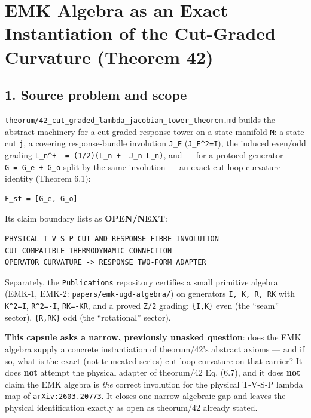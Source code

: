 \hypertarget{emk-algebra-as-an-exact-instantiation-of-the-cut-graded-curvature-theorem-42}{%
\chapter{EMK Algebra as an Exact Instantiation of the Cut-Graded Curvature (Theorem 42)}\label{emk-algebra-as-an-exact-instantiation-of-the-cut-graded-curvature-theorem-42}}

\hypertarget{source-problem-and-scope}{%
\section{1. Source problem and scope}\label{source-problem-and-scope}}

\texttt{theorum/42\_cut\_graded\_lambda\_jacobian\_tower\_theorem.md} builds the abstract
machinery for a cut-graded response tower on a state manifold \texttt{M}: a state
cut \texttt{j}, a covering response-bundle involution \texttt{J\_E} (\texttt{J\_E\^{}2=I}), the induced
even/odd grading \texttt{L\_n\^{}+-\ =\ (1/2)(L\_n\ +-\ J\_n\ L\_n)}, and --- for a protocol
generator \texttt{G\ =\ G\_e\ +\ G\_o} split by the same involution --- an exact cut-loop
curvature identity (Theorem 6.1):

\begin{verbatim}
F_st = [G_e, G_o]
\end{verbatim}

Its claim boundary lists as \textbf{OPEN/NEXT}:

\begin{verbatim}
PHYSICAL T-V-S-P CUT AND RESPONSE-FIBRE INVOLUTION
CUT-COMPATIBLE THERMODYNAMIC CONNECTION
OPERATOR CURVATURE -> RESPONSE TWO-FORM ADAPTER
\end{verbatim}

Separately, the \texttt{Publications} repository certifies a small primitive
algebra (EMK-1, EMK-2: \texttt{papers/emk-ugd-algebra/}) on generators \texttt{I,\ K,\ R,\ RK}
with \texttt{K\^{}2=I}, \texttt{R\^{}2=-I}, \texttt{RK=-KR}, and a proved \texttt{Z/2} grading: \texttt{\{I,K\}} even
(the ``seam'' sector), \texttt{\{R,RK\}} odd (the ``rotational'' sector).

\textbf{This capsule asks a narrow, previously unasked question}: does the EMK
algebra supply a concrete instantiation of theorum/42's abstract axioms ---
and if so, what is the exact (not truncated-series) cut-loop curvature on
that carrier? It does \textbf{not} attempt the physical adapter of theorum/42
Eq. (6.7), and it does \textbf{not} claim the EMK algebra is \emph{the} correct
involution for the physical T-V-S-P lambda map of \texttt{arXiv:2603.20773}. It
closes one narrow algebraic gap and leaves the physical identification
exactly as open as theorum/42 already stated.

